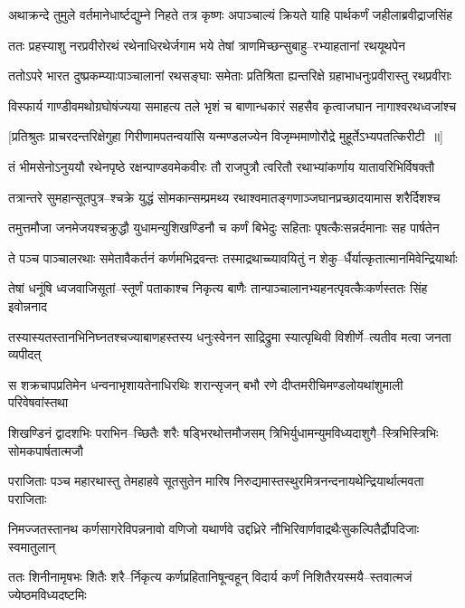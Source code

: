 \twolineshloka
{अथाक्रन्दे तुमुले वर्तमानेधार्ष्टद्युम्ने निहते तत्र कृष्णः}
{अपाञ्चाल्यं क्रियते याहि पार्थकर्णं जहीलाब्रवीद्राजसिंह}


\twolineshloka
{ततः प्रहस्याशु नरप्रवीरोरथं रथेनाधिरथेर्जगाम}
{भये तेषां त्राणमिच्छन्सुबाहु--रभ्याहतानां रथयूथपेन}


\twolineshloka
{ततोऽपरे भारत दुष्प्रकम्प्याःपाञ्चालानां रथसङ्घाः समेताः}
{प्रतिश्रिता ह्यन्तरिक्षे ग्रहाभाधनुःप्रवीरास्तु रथप्रवीराः}


\twolineshloka
{विस्फार्य गाण्डीवमथोग्रघोषंज्यया समाहत्य तले भृशं च}
{बाणान्धकारं सहसैव कृत्वाजघान नागाश्वरथध्वजांश्च}


\twolineshloka
{[प्रतिश्रुतः प्राचरदन्तरिक्षेगुहा गिरीणामपतन्वयांसि}
{यन्मण्डलज्येन विजृम्भमाणोरौद्रे मुहूर्तेऽभ्यपतत्किरीटी ॥]}


\twolineshloka
{तं भीमसेनोऽनुययौ रथेनपृष्ठे रक्षन्पाण्डवमेकवीरः}
{तौ राजपुत्रौ त्वरितौ रथाभ्यांकर्णाय यातावरिभिर्विषक्तौ}


\twolineshloka
{तत्रान्तरे सुमहान्सूतपुत्र--श्चक्रे युद्धं सोमकान्सम्प्रमथ्य}
{रथाश्वमातङ्गणाञ्जघानप्रच्छादयामास शरैर्दिशश्च}


\twolineshloka
{तमुत्तमौजा जनमेजयश्चक्रुद्धौ युधामन्युशिखण्डिनौ च}
{कर्णं बिभेदुः सहिताः पृषत्कैःसन्नर्दमानाः सह पार्षतेन}


\twolineshloka
{ते पञ्च पाञ्चालरथाः समेतावैकर्तनं कर्णमभिद्रवन्तः}
{तस्माद्रथाच्च्यावयितुं न शेकु--र्धैर्यात्कृतात्मानमिवेन्द्रियार्थाः}


\twolineshloka
{तेषां धनूंषि ध्वजवाजिसूतां--स्तूर्णं पताकाश्च निकृत्य बाणैः}
{तान्पाञ्चालानभ्यहनत्पृवत्कैःकर्णस्ततः सिंह इवोन्ननाद}


\twolineshloka
{तस्यास्यतस्तानभिनिघ्नतश्चज्याबाणहस्तस्य धनुःस्वेनन}
{साद्रिद्रुमा स्यात्पृथिवी विशीर्णे--त्यतीव मत्वा जनता व्यपीदत्}


\twolineshloka
{स शक्रचापप्रतिमेन धन्वनाभृशायतेनाधिरथिः शरान्सृजन्}
{बभौ रणे दीप्तमरीचिमण्डलोयथांशुमाली परिवेषवांस्तथा}


\twolineshloka
{शिखण्डिनं द्वादशभिः पराभिन--च्छितैः शरैः षड्भिरथोत्तमौजसम्}
{त्रिभिर्युधामन्युमविध्यदाशुगै--स्त्रिभिस्त्रिभिः सोमकपार्षतात्मजौ}


\twolineshloka
{पराजिताः पञ्च महारथास्तु तेमहाहवे सूतसुतेन मारिष}
{निरुद्यमास्तस्थुरमित्रनन्दनायथेन्द्रियार्थात्मवता पराजिताः}


\twolineshloka
{निमज्जतस्तानथ कर्णसागरेविपन्ननावो वणिजो यथार्णवे}
{उद्दध्रिरे नौभिरिवार्णवाद्रथैःसुकल्पितैर्द्रौपदिजाः स्वमातुलान्}


\twolineshloka
{ततः शिनीनामृषभः शितैः शरै--र्निकृत्य कर्णप्रहितानिषून्वहून्}
{विदार्य कर्णं निशितैरयस्मयै--स्तवात्मजं ज्येष्ठमविध्यदष्टमिः}


